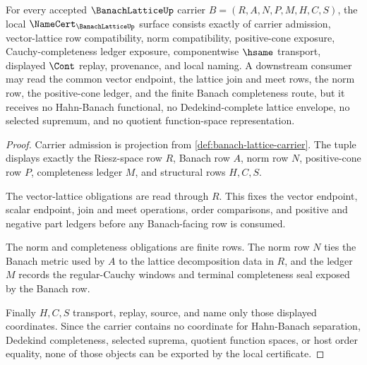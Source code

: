 \begin{theorem}
\label{thm:banach-lattice-namecert-obligations}
For every accepted $\BanachLatticeUp$ carrier $B=(R,A,N,P,M,H,C,S)$, the local $\NameCert_{\BanachLatticeUp}$ surface consists exactly of carrier admission, vector-lattice row compatibility, norm compatibility, positive-cone exposure, Cauchy-completeness ledger exposure, componentwise $\hsame$ transport, displayed $\Cont$ replay, provenance, and local naming. A downstream consumer may read the common vector endpoint, the lattice join and meet rows, the norm row, the positive-cone ledger, and the finite Banach completeness route, but it receives no Hahn-Banach functional, no Dedekind-complete lattice envelope, no selected supremum, and no quotient function-space representation.
\end{theorem}
\begin{proof}
Carrier admission is projection from \autoref{def:banach-lattice-carrier}. The tuple displays exactly the Riesz-space row $R$, Banach row $A$, norm row $N$, positive-cone row $P$, completeness ledger $M$, and structural rows $H,C,S$.

The vector-lattice obligations are read through $R$. This fixes the vector endpoint, scalar endpoint, join and meet operations, order comparisons, and positive and negative part ledgers before any Banach-facing row is consumed.

The norm and completeness obligations are finite rows. The norm row $N$ ties the Banach metric used by $A$ to the lattice decomposition data in $R$, and the ledger $M$ records the regular-Cauchy windows and terminal completeness seal exposed by the Banach row.

Finally $H,C,S$ transport, replay, source, and name only those displayed coordinates. Since the carrier contains no coordinate for Hahn-Banach separation, Dedekind completeness, selected suprema, quotient function spaces, or host order equality, none of those objects can be exported by the local certificate.
\end{proof}

